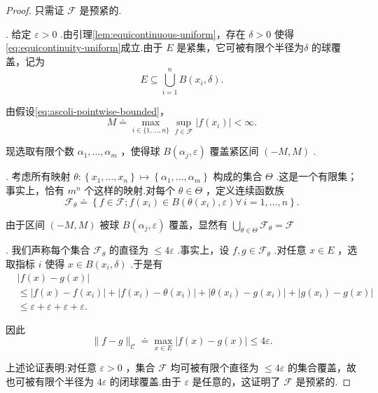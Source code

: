 \begin{proof}
只需证 $\mathcal{F}$ 是预紧的.

. 给定 $\varepsilon  > 0$ .由引理\ref{lem:equicontinuous-uniform}，存在 $\delta  > 0$ 使得\eqref{eq:equicontinuity-uniform}成立.由于 $E$ 是紧集，它可被有限个半径为$\delta$ 的球覆盖，记为
\[
E \subseteq  \mathop{\bigcup }\limits_{{i = 1}}^{n}B\left( {{x}_{i},\delta }\right) .
\]

由假设\eqref{eq:ascoli-pointwise-bounded}，
\[
M \doteq  \mathop{\max }\limits_{{i \in  \{ 1,\ldots ,n\} }}\mathop{\sup }\limits_{{f \in  \mathcal{F}}}\left| {f\left( {x}_{i}\right) }\right|  < \infty .
\]

现选取有限个数 ${\alpha }_{1},\ldots ,{\alpha }_{m}$ ，使得球 $B\left( {{\alpha }_{j},\varepsilon }\right)$ 覆盖紧区间 $\left(  {-M,M}\right)$ .

. 考虑所有映射 $\theta  : \left\{  {{x}_{1},\ldots ,{x}_{n}}\right\}   \mapsto  \left\{  {{\alpha }_{1},\ldots ,{\alpha }_{m}}\right\}$ 构成的集合 $\Theta$ .这是一个有限集；事实上，恰有 ${m}^{n}$ 个这样的映射.对每个 $\theta  \in  \Theta$ ，定义连续函数族
\[
{\mathcal{F}}_{\theta } \doteq  \left\{  {f \in  \mathcal{F};f\left( {x}_{i}\right)  \in  B\left( {\theta \left( {x}_{i}\right) ,\varepsilon }\right) \forall\,i = 1,\ldots ,n}\right\}  .
\]

由于区间 $\left(  {-M,M}\right)$ 被球 $B\left( {{\alpha }_{j},\varepsilon }\right)$ 覆盖，显然有 $\mathop{\bigcup }\limits_{{\theta  \in  \Theta }}{\mathcal{F}}_{\theta } = \mathcal{F}$

. 我们声称每个集合 ${\mathcal{F}}_{\theta }$ 的直径为 $\leq  {4\varepsilon }$ .事实上，设 $f,g \in  {\mathcal{F}}_{\theta }$ .对任意 $x \in  E$ ，选取指标 $i$ 使得 $x \in  B\left( {{x}_{i},\delta }\right)$ .于是有
{\setjot[-2]\begin{align*}
    &\left| {f\left( x\right)  - g\left( x\right) }\right|   \\
    &\leq  \left| {f\left( x\right)  - f\left( {x}_{i}\right) }\right|  + \left| {f\left( {x}_{i}\right)  - \theta \left( {x}_{i}\right) }\right|  + \left| {\theta \left( {x}_{i}\right)  - g\left( {x}_{i}\right) }\right|  + \left| {g\left( {x}_{i}\right)  - g\left( x\right) }\right| \\
    &\leq  \varepsilon  + \varepsilon  + \varepsilon  + \varepsilon .
\end{align*}}

因此
\[
\| f - g{\| }_{\mathcal{C}} \doteq  \mathop{\max }\limits_{{x \in  E}}\left| {f\left( x\right)  - g\left( x\right) }\right|  \leq  {4\varepsilon }.
\]

上述论证表明:对任意 $\varepsilon  > 0$ ，集合 $\mathcal{F}$ 均可被有限个直径为 $\leq  {4\varepsilon }$ 的集合覆盖，故也可被有限个半径为 ${4\varepsilon }$ 的闭球覆盖.由于 $\varepsilon$ 是任意的，这证明了 $\mathcal{F}$ 是预紧的.
\end{proof}

